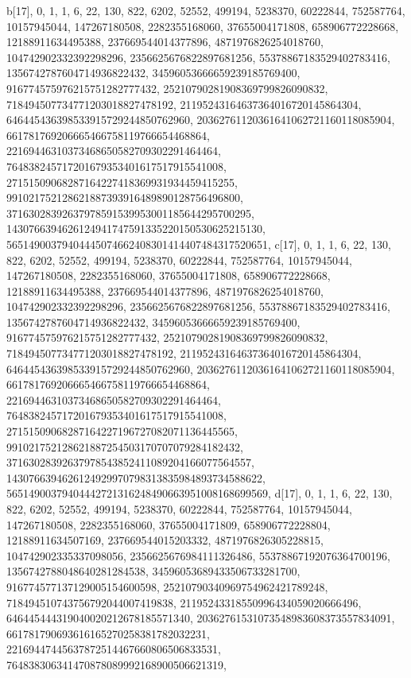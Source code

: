 { {b[17], {0, 1, 1, 6, 22, 130, 822, 6202, 52552, 499194, 5238370, 60222844, 
   752587764, 10157945044, 147267180508, 2282355168060, 37655004171808, 
   658906772228668, 12188911634495388, 237669544014377896, 
   4871976826254018760, 104742902332392298296, 2356625676822897681256, 
   55378867183529402783416, 1356742787604714936822432, 
   34596053666659239185769400, 916774575976215751282777432, 
   25210790281908369799826090832, 718494507734771203018827478192, 
   21195243164637364016720145864304, 646445436398533915729244850762960, 
   20362761120361641062721160118085904, 661781769206665466758119766654468864, 
   22169446310373468650582709302291464464, 
   764838245717201679353401617517915541008, 
   27151509068287164227418369931934459415255, 
   991021752128621887393916489890128756496800, 
   37163028392637978591539953001185644295700295, 
   1430766394626124941747591335220150530625215130, 
   56514900379404445074662408301414407484317520651}}, 
 {c[17], {0, 1, 1, 6, 22, 130, 822, 6202, 52552, 499194, 5238370, 60222844, 
   752587764, 10157945044, 147267180508, 2282355168060, 37655004171808, 
   658906772228668, 12188911634495388, 237669544014377896, 
   4871976826254018760, 104742902332392298296, 2356625676822897681256, 
   55378867183529402783416, 1356742787604714936822432, 
   34596053666659239185769400, 916774575976215751282777432, 
   25210790281908369799826090832, 718494507734771203018827478192, 
   21195243164637364016720145864304, 646445436398533915729244850762960, 
   20362761120361641062721160118085904, 661781769206665466758119766654468864, 
   22169446310373468650582709302291464464, 
   764838245717201679353401617517915541008, 
   27151509068287164227196727082071136445565, 
   991021752128621887254503170707079284182432, 
   37163028392637978543852411089204166077564557, 
   1430766394626124929970798313835984893734588622, 
   56514900379404442721316248490663951008168699569}}, 
 {d[17], {0, 1, 1, 6, 22, 130, 822, 6202, 52552, 499194, 5238370, 60222844, 
   752587764, 10157945044, 147267180508, 2282355168060, 37655004171809, 
   658906772228804, 12188911634507169, 237669544015203332, 
   4871976826305228815, 104742902335337098056, 2356625676984111326486, 
   55378867192076364700196, 1356742788048640281284538, 
   34596053689433506733281700, 916774577137129005154600598, 
   25210790340969754962421789248, 718494510743756792044007419838, 
   21195243318550996434059020666496, 646445444319040020212678185571340, 
   20362761531073548983608373557834091, 661781790693616165270258381782032231, 
   22169447445637872514467660806506833531, 
   764838306341470878089992168900506621319, 
}}}

